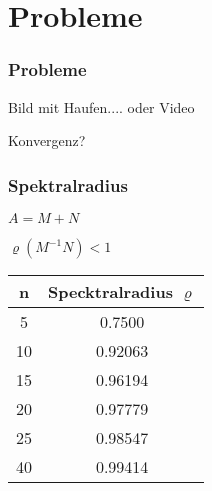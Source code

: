 \section{Probleme}
\begin{frame}
\frametitle{Probleme} 
	\centering
	Bild mit Haufen.... oder Video
\end{frame}

\begin{frame}
	\centering
	\huge Konvergenz?
\end{frame}

\begin{frame}
\frametitle{Spektralradius}
\centering
		$A = M+N$
		
		$\varrho(M^{-1}N)<1 $

		\begin{table}[h]
			\begin{tabular}{cc}
				n & Specktralradius $\varrho$\\\hline
				5 & 0.7500\\
				10 & 0.92063\\
				15 & 0.96194\\
				20 & 0.97779\\
				25 & 0.98547\\
				40 & 0.99414
			\end{tabular}
			\centering
		\end{table}
\end{frame}